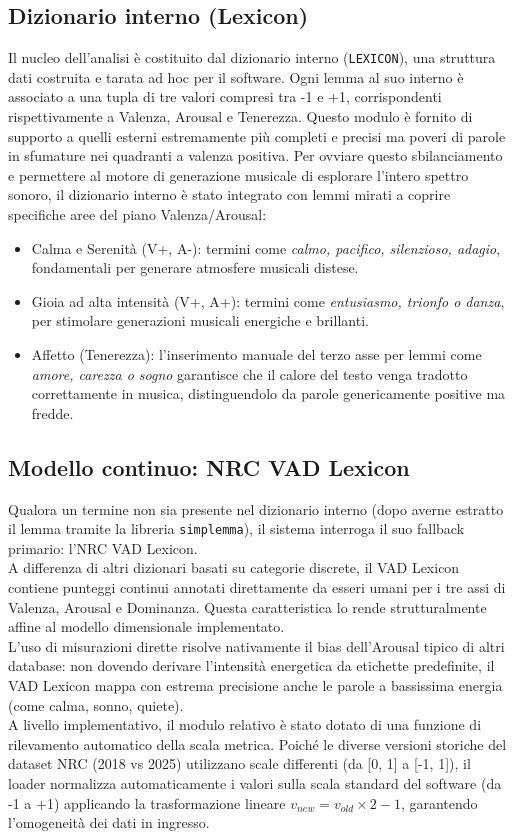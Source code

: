 \subsection{Dizionario interno (Lexicon)}
Il nucleo dell'analisi è costituito dal dizionario interno (\texttt{LEXICON}), una struttura dati costruita e tarata ad hoc per il software. 
Ogni lemma al suo interno è associato a una tupla di tre valori compresi tra -1 e +1, corrispondenti rispettivamente a Valenza, Arousal e Tenerezza. 
Questo modulo è fornito di supporto a quelli esterni estremamente più completi e precisi ma poveri di parole in sfumature nei quadranti a valenza positiva.
Per ovviare questo sbilanciamento e permettere al motore di generazione musicale di esplorare l'intero spettro sonoro, il dizionario interno è stato 
integrato con lemmi mirati a coprire specifiche aree del piano Valenza/Arousal: 
\begin{itemize}
    \item Calma e Serenità (V+, A-): termini come \textit{calmo, pacifico, silenzioso, adagio}, fondamentali per generare atmosfere musicali distese.
    \item Gioia ad alta intensità (V+, A+): termini come \textit{entusiasmo, trionfo o danza}, per stimolare generazioni musicali energiche e brillanti.
    \item  Affetto (Tenerezza): l'inserimento manuale del terzo asse per lemmi come \textit{amore, carezza o sogno} garantisce che il calore del testo venga 
    tradotto correttamente in musica, distinguendolo da parole genericamente positive ma fredde.
\end{itemize}

\subsection{Modello continuo: NRC VAD Lexicon}
Qualora un termine non sia presente nel dizionario interno (dopo averne estratto il lemma tramite la libreria \texttt{simplemma}), il sistema interroga il suo 
fallback primario: l'NRC VAD Lexicon.\\
A differenza di altri dizionari basati su categorie discrete, il VAD Lexicon contiene punteggi continui annotati direttamente da esseri umani per i tre 
assi di Valenza, Arousal e Dominanza. Questa caratteristica lo rende strutturalmente affine al modello dimensionale implementato.\\
L'uso di misurazioni dirette risolve nativamente il bias dell'Arousal tipico di altri database: non dovendo derivare l'intensità energetica da 
etichette predefinite, il VAD Lexicon mappa con estrema precisione anche le parole a bassissima energia (come calma, sonno, quiete).\\
A livello implementativo, il modulo relativo è stato dotato di una funzione di rilevamento automatico della scala metrica. Poiché le diverse versioni 
storiche del dataset NRC (2018 vs 2025) utilizzano scale differenti (da [0, 1] a [-1, 1]), il loader normalizza automaticamente i valori sulla 
scala standard del software (da -1 a +1) applicando la trasformazione lineare $v_{\mathit{new}} = v_{\mathit{old}} \times 2 - 1$, garantendo l'omogeneità 
dei dati in ingresso.

